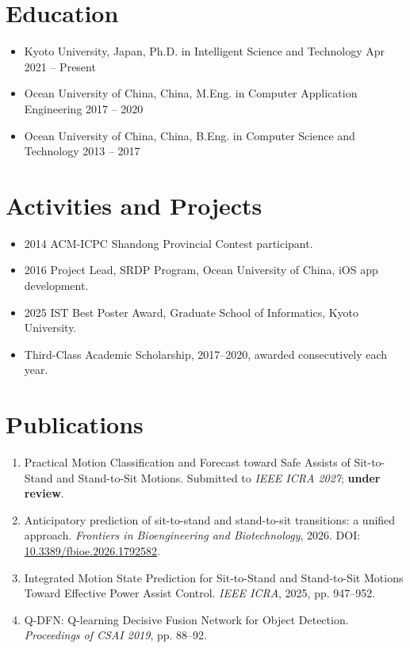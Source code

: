 \documentclass[10pt,letterpaper]{article}
\begin{document}
\section*{Education}
\begin{itemize}
  \item Kyoto University, Japan, Ph.D. in Intelligent Science and Technology \hfill Apr 2021 -- Present
  \item Ocean University of China, China, M.Eng. in Computer Application Engineering \hfill 2017 -- 2020
  \item Ocean University of China, China, B.Eng. in Computer Science and Technology \hfill 2013 -- 2017
\end{itemize}

\section*{Activities and Projects}
\begin{itemize}
  \item 2014 ACM-ICPC Shandong Provincial Contest participant.
  \item 2016 Project Lead, SRDP Program, Ocean University of China, iOS app development.
  \item 2025 IST Best Poster Award, Graduate School of Informatics, Kyoto University.
  \item Third-Class Academic Scholarship, 2017--2020, awarded consecutively each year.
\end{itemize}

\section*{Publications}
\begin{enumerate}
  \item Practical Motion Classification and Forecast toward Safe Assists of Sit-to-Stand and Stand-to-Sit Motions. Submitted to \textit{IEEE ICRA 2027}; \textbf{under review}.
  \item Anticipatory prediction of sit-to-stand and stand-to-sit transitions: a unified approach. \textit{Frontiers in Bioengineering and Biotechnology}, 2026. DOI: \href{https://doi.org/10.3389/fbioe.2026.1792582}{10.3389/fbioe.2026.1792582}.
  \item Integrated Motion State Prediction for Sit-to-Stand and Stand-to-Sit Motions Toward Effective Power Assist Control. \textit{IEEE ICRA}, 2025, pp. 947--952.
  \item Q-DFN: Q-learning Decisive Fusion Network for Object Detection. \textit{Proceedings of CSAI 2019}, pp. 88--92.
\end{enumerate}
\end{document}
